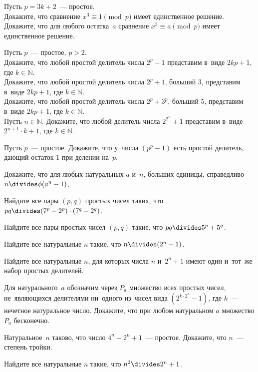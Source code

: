 \begin{problems}

\item
Пусть $p = 3 k + 2$~--- простое.
\\
\subproblem
Докажите, что сравнение $x^3 \equiv 1 \pmod{p}$ имеет единственное решение.
\\
\subproblem
Докажите, что для любого оcтатка~$a$ сравнение $x^3 \equiv a \pmod{p}$ имеет
единственное решение.

\item
Пусть $p$~--- простое, $p > 2$.
\\
\subproblem
Докажите, что любой простой делитель числа $2^p - 1$ представим
в~виде $2 k p + 1$, где $k \in \mathbb{N}$.
\\
\subproblem
Докажите, что любой простой делитель числа $2^p + 1$, больший 3, представим
в~виде $2 k p + 1$, где $k \in \mathbb{N}$.
\\
\subproblem
Докажите, что любой простой делитель числа $2^p + 3^p$, больший 5, представим
в~виде $2 k p + 1$, где $k \in \mathbb{N}$.
\\
\subproblem
Пусть $n \in \mathbb{N}$.
Докажите, что любой делитель числа $2^{2^n} + 1$ представим
в~виде $2^{n+1} \cdot k + 1$, где $k \in \mathbb{N}$.

\item
Пусть $p$~--- простое.
Докажите, что у~числа $(p^p - 1)$ есть простой делитель, дающий остаток 1 при
делении на~$p$.

\item
Докажите, что для любых натуральных $a$ и~$n$, больших единицы, справедливо
$n \divides \eulerphi(a^n - 1)$.

\item
Найдите все пары $(p, q)$ простых чисел таких, что
$p q \divides (7^{p} - 2^{p}) \cdot (7^{q} - 2^{q})$.

\item
Найдите все пары простых чисел $(p, q)$ такие, что $p q \divides 5^{p} + 5^{q}$.

\item
Найдите все натуральные $n$ такие, что $n \divides (2^n - 1)$.

\item
Найдите все натуральные $n$, для которых числа $n$ и~$2^n + 1$ имеют один
и~тот~же набор простых делителей. 	

\item
Для натурального~$a$ обозначим через $P_a$ множество всех простых чисел,
не~являющихся делителями ни~одного из~чисел вида $(2^{k \cdot 2^a} - 1)$, где
$k$~--- нечетное натуральное число.
Докажите, что при любом натуральном $a$ множество $P_a$ бесконечно.

\item
Натуральное~$n$ таково, что число $4^n + 2^n + 1$~--- простое.
Докажите, что $n$~--- степень тройки.

\item
Найдите все натуральные $n$ такие, что $n^2 \divides 2^n + 1$.

\end{problems}

\endgroup %

